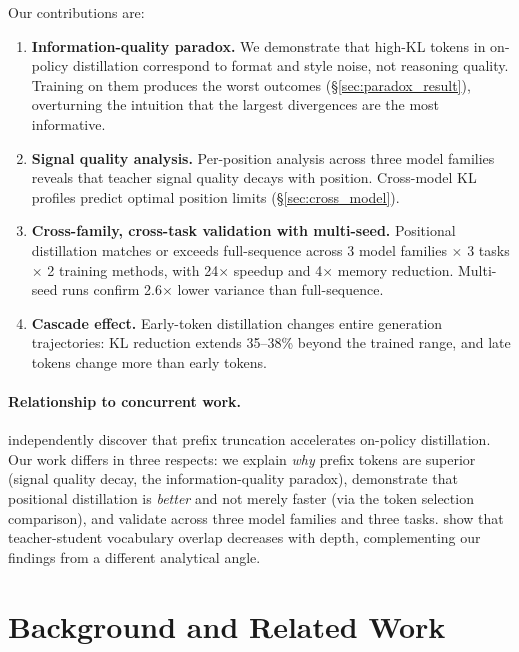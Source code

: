 Our contributions are:
\begin{enumerate}[leftmargin=*,itemsep=2pt,topsep=2pt]
    \item \textbf{Information-quality paradox.} We demonstrate that high-KL tokens in on-policy distillation correspond to format and style noise, not reasoning quality. Training on them produces the worst outcomes (\S\ref{sec:paradox_result}), overturning the intuition that the largest divergences are the most informative.
    \item \textbf{Signal quality analysis.} Per-position analysis across three model families reveals that teacher signal quality decays with position. Cross-model KL profiles predict optimal position limits (\S\ref{sec:cross_model}).
    \item \textbf{Cross-family, cross-task validation with multi-seed.} Positional distillation matches or exceeds full-sequence across 3 model families $\times$ 3 tasks $\times$ 2 training methods, with 24$\times$ speedup and 4$\times$ memory reduction. Multi-seed runs confirm 2.6$\times$ lower variance than full-sequence.
    \item \textbf{Cascade effect.} Early-token distillation changes entire generation trajectories: KL reduction extends 35--38\% beyond the trained range, and late tokens change more than early tokens.
\end{enumerate}

\paragraph{Relationship to concurrent work.}
\citet{zhang2025fast} independently discover that prefix truncation accelerates on-policy distillation.
Our work differs in three respects: we explain \emph{why} prefix tokens are superior (signal quality decay, the information-quality paradox), demonstrate that positional distillation is \emph{better} and not merely faster (via the token selection comparison), and validate across three model families and three tasks.
\citet{li2025rethinking} show that teacher-student vocabulary overlap decreases with depth, complementing our findings from a different analytical angle.


\section{Background and Related Work}
\label{sec:background}

